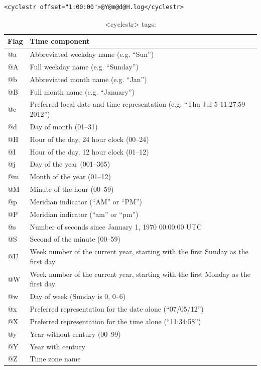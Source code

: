 \documentclass[11pt,fleqn]{report}              %
\begin{document}
\begin{enumerate}
\lstset{language=XML}   
\begin{lstlisting}[frame=trBL]
<cyclestr offset="1:00:00">@Y@m@d@H.log</cyclestr>
\end{lstlisting}

\begin{table}[ht!]
\centering
\caption{<cyclestr> tags:}
{\begin{tabular}{l | l  }
\hline
\hline
Flag & Time component  \\
\hline
@a & Abbreviated weekday name (e.g. ``Sun'') \\
@A & Full weekday name (e.g. ``Sunday'') \\
@b & Abbreviated month name (e.g. ``Jan'') \\
@B & Full month name (e.g. ``January'')\\
@c & Preferred local date and time representation (e.g. ``Thu Jul 5 11:27:59 2012'') \\
@d & Day of month (01--31) \\
@H & Hour of the day, 24 hour clock (00--24) \\
@I & Hour of the day, 12 hour clock (01--12) \\
@j & Day of the year (001--365) \\
@m & Month of the year (01--12) \\
@M & Minute of the hour (00--59) \\
@p & Meridian indicator (``AM'' or ``PM'')\\
@P & Meridian indicator (``am'' or ``pm'') \\
@s & Number of seconds since January 1, 1970 00:00:00 UTC\\
@S & Second of the minute (00--59) \\
@U & Week number of the current year, starting with the first Sunday as the first day \\
@W & Week number of the current year, starting with the first Monday as the first day \\
@w & Day of week (Sunday is 0, 0--6) \\
@x & Preferred representation for the date alone (``07/05/12'') \\
@X & Preferred representation for the time alone (``11:34:58'') \\
@y & Year without century (00--99) \\
@Y & Year with century \\
@Z & Time zone name \\ 
\hline
\end{tabular}}
\label{table:cyclestr_tag}
\end{table}




\end{enumerate}
\end{document}
